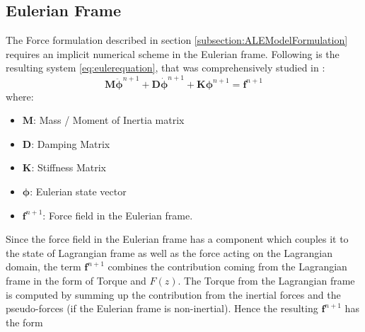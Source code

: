 \subsection{Eulerian Frame} \label{subsection:euler}
The Force formulation described in section \ref{subsection:ALEModelFormulation} requires an implicit numerical scheme in the Eulerian frame. Following is the resulting system \eqref{eq:eulerequation}, that was comprehensively studied in \cite{stefanthesis}:
\begin{equation} \label{eq:eulerequation}
     \boldsymbol{M} \ddot{\boldsymbol{\phi}}^{n+1}+ \boldsymbol{D} \dot{\boldsymbol{\phi}}^{n+1} + \boldsymbol{K}\boldsymbol{\phi}^{n+1}=\boldsymbol{f}^{n+1}
\end{equation}
where:
    \begin{itemize}
        \item $\boldsymbol{M}$: Mass / Moment of Inertia matrix
        \item $\boldsymbol{D}$: Damping Matrix
        \item $\boldsymbol{K}$: Stiffness Matrix
        \item $\boldsymbol{\phi}$: Eulerian state vector
        \item $\boldsymbol{f}^{n+1}$: Force field in the Eulerian frame.
    \end{itemize}
Since the force field in the Eulerian frame has a component which couples it to the state of Lagrangian frame as well as the force acting on the Lagrangian domain, the term $\boldsymbol{f}^{n+1}$ combines the contribution coming from the Lagrangian frame in the form of Torque and $F(z)$. The Torque from the Lagrangian frame is computed by summing up the contribution from the inertial forces and the pseudo-forces (if the Eulerian frame is non-inertial). Hence the resulting $\boldsymbol{f}^{n+1}$ has the form

